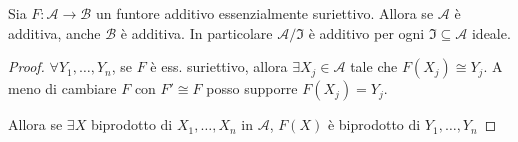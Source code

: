 \begin{proposition}{}
    Sia \(F: \mathcal{A} \to \mathcal{B}\) un funtore additivo essenzialmente
    suriettivo. Allora se \(\mathcal{A}\) è additiva, anche \(\mathcal{B}\) è
    additiva. In particolare \(\mathcal{A}/\mathfrak{I}\) è additivo per ogni \(\mathfrak{I} \subseteq \mathcal{A} \) 
    ideale.
\end{proposition}

\begin{proof}{}
    \(\forall Y_{1}, \dots, Y_{n}\), se \(F\) è ess. suriettivo, allora \(\exists X_{j} \in \mathcal{A}\) 
    tale che \(F{(X_{j})} \cong Y_j\). A meno di cambiare \(F\) con \(F' \cong F\) 
    posso supporre \(F {(X_{j})} = Y_{j}\).

    Allora se \(\exists X\) biprodotto di \(X_{1}, \dots, X_{n}\) in \(\mathcal{A}\), \(F{(X)}\) è 
    biprodotto di \(Y_{1}, \dots, Y_{n}\) 
\end{proof}


